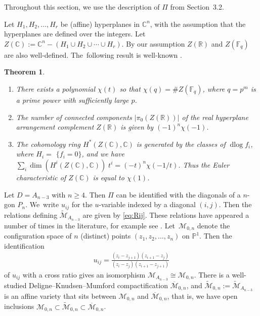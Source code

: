 \documentclass[10pt,a4paper]{amsart}
\def\R{{\mathbb R}}
\def\C{{\mathbb C}}
\def\F{{\mathbb F}}
\def\M{{\mathcal{M}}}
\def\tM{{\widetilde {\mathcal{M}}}}
\def\bM{{\overline {\mathcal{M}}}}
\def\dlog{\operatorname{dlog}}
\renewcommand{\P}{{\mathbb P}}
\numberwithin{equation}{section}
\newtheorem{Theorem}{Theorem}[section]
\begin{document}
Throughout this section, we use the description of $\Pi$ from Section~3.2.

{\samepage\bigskip{}
Let $H_1, H_2,\dots,H_r$ be (affine) hyperplanes in $\C^n$, with the assumption that the hyperplanes are defined over the integers. Let~$Z(\C) := \C^n - (H_1 \cup H_2 \cup \cdots \cup H_r)$. By our assumption $Z(\R)$ and $Z(\F_q)$ are also well-defined. The~following result is well-known \cite{OT, Sta}.

}
\begin{Theorem} \label{thm:hyp} \
\begin{enumerate}\itemsep=0pt
\item[$1.$] There exists a polynomial $\chi(t)$ so that $\chi(q) = \#Z(\F_q)$, where $q = p^m$ is a prime power with sufficiently large $p$.
\item[$2.$] The number of connected components $|\pi_0(Z(\R))|$ of the real hyperplane arrangement complement $Z(\R)$ is given by $(-1)^n \chi(-1)$.
\item[$3.$] The cohomology ring $H^*(Z(\C),\C)$ is generated by the classes of $\dlog f_i$, where $H_i =$ \mbox{$\{f_i =0\}$}, and we have $\sum_i \dim(H^i (Z(\C),\C)) \;t^i = (-t)^n \chi(-1/t)$. Thus the Euler characteristic of $Z(\C)$ is equal to $\chi(1)$.
\end{enumerate}
\end{Theorem}

\bigskip{} %
Let $D = A_{n-3}$ with $n \geq 4$. Then $\Pi$ can be identified with the diagonals of a $n$-gon $P_n$. We~write $u_{ij}$ for the $u$-variable indexed by a diagonal $(i,j)$. Then the relations defining $\tM_{A_{n-3}}$ are given by \eqref{eq:Rij}.
These relations have appeared a number of times in the literature, for example see \cite{ABHY,Brown}. Let~$\M_{0,n}$ denote the configuration space of $n$ (distinct) points $(z_1,z_2,\dots,z_n)$ on $\P^1$. Then the identification
\begin{gather}\label{eq:uij}
u_{ij} = \frac{(z_i - z_{j+1})(z_{i+1}-z_j)}{(z_i - z_j)(z_{i+1}-z_{j+1})}
\end{gather}
of $u_{ij}$ with a cross ratio gives an isomorphism $\M_{A_{n-3}} \cong \M_{0,n}$. There is a well-studied Deligne--Knudsen--Mumford compactification $\bM_{0,n}$, and $\tM_{0,n}:=\tM_{A_{n-3}}$ is an affine variety that sits between $\M_{0,n}$ and $\bM_{0,n}$, that is, we have open inclusions $\M_{0,n} \subset \tM_{0,n} \subset \bM_{0,n}$.
\end{document}
